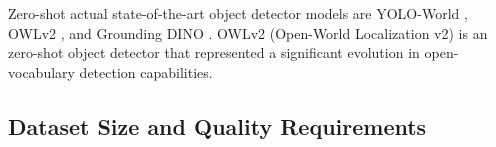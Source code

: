 \documentclass[journal,article,submit,pdftex,moreauthors]{Definitions/mdpi}
\begin{document}
Zero-shot actual state-of-the-art object detector models are YOLO-World \cite{kangFewshotObjectDetection2019} , 
OWLv2 \cite{mindererScalingOpenVocabularyObject2023} , and Grounding DINO \cite{liuGroundingDINOMarrying2025}.
OWLv2 (Open-World Localization v2) is an zero-shot object detector that represented a significant 
evolution in open-vocabulary detection capabilities. 

\subsection{Dataset Size and Quality Requirements}
\end{document}
